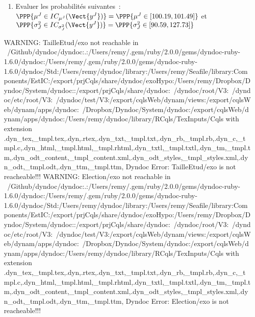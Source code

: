\documentclass[10pt]{report}
\begin{document}
\begin{exercice}
\begin{enumerate}
\begin{center}
\begin{tabular}{c|cc|cc}
        $[77.91,114.13]$
         & 
    
        $1$
        
    \\ \cline{1-5}

    
        Moyenne
         & 
    
        
         & 
    
        $94.86\%$
         & 
    
        
         & 
    
        $92.02\%$
        
    \\ 

    \end{tabular}
\end{center}
\item Evaluer les probabilités suivantes~:\\
$\PPP{\mu^J \in IC_{\mu^J}(\Vect{y^J})}=\PPP{\mu^J\in [100.19,101.49]}$ et $\PPP{\sigma^2_J\in IC_{\sigma^2_J}(\Vect{y^J})}=\PPP{\sigma^2_J\in [90.59,127.73]}$

\end{enumerate}
\end{exercice}

WARNING: TailleEtud/exo not reachable in ~/Github/dyndoc/dyndoc:.:/Users/remy/.gem/ruby/2.0.0/gems/dyndoc-ruby-1.6.0/dyndoc:/Users/remy/.gem/ruby/2.0.0/gems/dyndoc-ruby-1.6.0/dyndoc/Std:/Users/remy/dyndoc/library:/Users/remy/Seafile/library:Components/EstIC:/export/prjCqls/share/dyndoc/exoHypo:/Users/remy/Dropbox/Dyndoc/System/dyndoc::/export/prjCqls/share/dyndoc:~/dyndoc/root/V3:~/dyndoc/etc/root/V3:~/dyndoc/test/V3:/export/cqlsWeb/dynam/views:/export/cqlsWeb/dynam/apps/dyndoc:~/Dropbox/Dyndoc/System/dyndoc:/export/cqlsWeb/dynam/apps/dyndoc:/Users/remy/dyndoc/library/RCqls/TexInputs/Cqls with extension .dyn_tex,_tmpl.tex,.dyn,.rtex,.dyn_txt,_tmpl.txt,.dyn_rb,_tmpl.rb,.dyn_c,_tmpl.c,.dyn_html,_tmpl.html,_tmpl.rhtml,.dyn_txtl,_tmpl.txtl,.dyn_tm,_tmpl.tm,.dyn_odt_content,_tmpl_content.xml,.dyn_odt_styles,_tmpl_styles.xml,.dyn_odt,_tmpl.odt,.dyn_ttm,_tmpl.ttm,
Dyndoc Error: TailleEtud/exo is not reacheable!!! 
WARNING: Election/exo not reachable in ~/Github/dyndoc/dyndoc:.:/Users/remy/.gem/ruby/2.0.0/gems/dyndoc-ruby-1.6.0/dyndoc:/Users/remy/.gem/ruby/2.0.0/gems/dyndoc-ruby-1.6.0/dyndoc/Std:/Users/remy/dyndoc/library:/Users/remy/Seafile/library:Components/EstIC:/export/prjCqls/share/dyndoc/exoHypo:/Users/remy/Dropbox/Dyndoc/System/dyndoc::/export/prjCqls/share/dyndoc:~/dyndoc/root/V3:~/dyndoc/etc/root/V3:~/dyndoc/test/V3:/export/cqlsWeb/dynam/views:/export/cqlsWeb/dynam/apps/dyndoc:~/Dropbox/Dyndoc/System/dyndoc:/export/cqlsWeb/dynam/apps/dyndoc:/Users/remy/dyndoc/library/RCqls/TexInputs/Cqls with extension .dyn_tex,_tmpl.tex,.dyn,.rtex,.dyn_txt,_tmpl.txt,.dyn_rb,_tmpl.rb,.dyn_c,_tmpl.c,.dyn_html,_tmpl.html,_tmpl.rhtml,.dyn_txtl,_tmpl.txtl,.dyn_tm,_tmpl.tm,.dyn_odt_content,_tmpl_content.xml,.dyn_odt_styles,_tmpl_styles.xml,.dyn_odt,_tmpl.odt,.dyn_ttm,_tmpl.ttm,
Dyndoc Error: Election/exo is not reacheable!!! 
\end{document}
